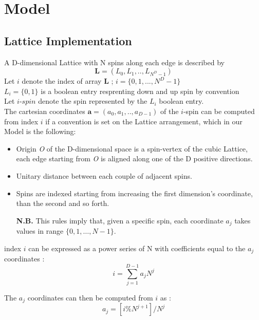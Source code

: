 \documentclass[11pt,a4paper]{article}
\begin{document}
\newpage


\section*{Model }

\subsection{Lattice Implementation}

A D-dimensional Lattice with N spins along each edge is described by 
$$\mathbf{L} = (L_0,L_1,..,L_{N^D-1})$$
Let $i$ denote the index of array $\mathbf{L}$ ; $i = \{0,1,...,N^D -1\}$\\
$L_i = \{0,1\}$ is a boolean entry resprenting down and up spin by convention \\
Let $i$-$spin$ denote the spin represented by the $L_i$ boolean entry. \\
The cartesian coordinates $\mathbf{a} = (a_0,a_1,..,a_{D-1})$ of the $i$-spin can be computed from index $i$ if a convention is set on the Lattice arrangement, which in our Model is the following:
\begin{itemize}
\item Origin \textit{O} of the D-dimensional space is a spin-vertex of the cubic Lattice, each edge starting from \textit{O} is aligned along one of the D positive directions.
\item Unitary distance between each couple of adjacent spins.
\item Spins are indexed starting from increasing the first dimension’s coordinate, than the second and so forth.
\item[\textbf{N.B.}] This rules imply that, given a specific spin, each coordinate $a_j$ takes values in range $\{0,1,…,N-1\}$. \\
\end{itemize}


index $i$ can be expressed as a power series of N with coefficients equal to the $a_j$ coordinates :
\begin{equation}
i = \sum_{j=1}^{D-1}a_jN^j
\end{equation}

The $a_j$ coordinates can then be computed from $i$ as :
\begin{equation}
a_j = [i\%N^{j+1}]/N^j
\end{equation}
\end{document}
